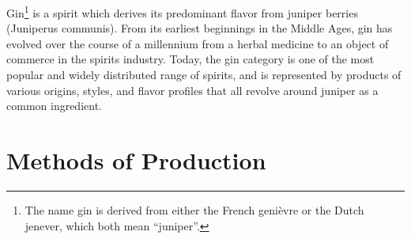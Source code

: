 Gin\footnote{The name gin is derived from either the French genièvre or the
Dutch jenever, which both mean ``juniper''.} is a spirit which derives its
predominant flavor from juniper berries (Juniperus communis). From its earliest
beginnings in the Middle Ages, gin has evolved over the course of a millennium
from a herbal medicine to an object of commerce in the spirits industry. Today,
the gin category is one of the most popular and widely distributed range of
spirits, and is represented by products of various origins, styles, and flavor
profiles that all revolve around juniper as a common ingredient.\parencite{wiki:gin}

\section{Methods of Production}
